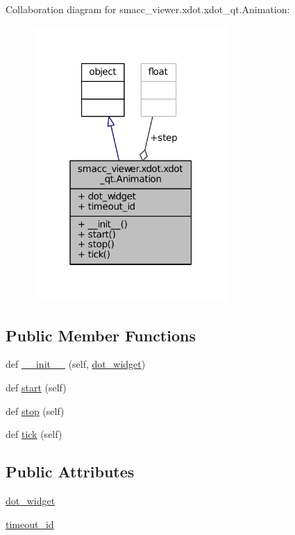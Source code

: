 Collaboration diagram for smacc\+\_\+viewer.\+xdot.\+xdot\+\_\+qt.\+Animation\+:
\nopagebreak
\begin{figure}[H]
\begin{center}
\leavevmode
\includegraphics[width=211pt]{classsmacc__viewer_1_1xdot_1_1xdot__qt_1_1Animation__coll__graph}
\end{center}
\end{figure}
\subsection*{Public Member Functions}
\begin{DoxyCompactItemize}
\item 
def \hyperlink{classsmacc__viewer_1_1xdot_1_1xdot__qt_1_1Animation_a9f97d0f2794cbc850d0e0cfe17545250}{\+\_\+\+\_\+init\+\_\+\+\_\+} (self, \hyperlink{classsmacc__viewer_1_1xdot_1_1xdot__qt_1_1Animation_a8343fc754289769e4199933a2ef8b6c2}{dot\+\_\+widget})
\item 
def \hyperlink{classsmacc__viewer_1_1xdot_1_1xdot__qt_1_1Animation_ae51817045f1a7a2151dfe6ffac96a650}{start} (self)
\item 
def \hyperlink{classsmacc__viewer_1_1xdot_1_1xdot__qt_1_1Animation_a2dcd0c6cbcae7adc73fad78fd3f09e21}{stop} (self)
\item 
def \hyperlink{classsmacc__viewer_1_1xdot_1_1xdot__qt_1_1Animation_a9f6f08e355fca56a746949121d36a47d}{tick} (self)
\end{DoxyCompactItemize}
\subsection*{Public Attributes}
\begin{DoxyCompactItemize}
\item 
\hyperlink{classsmacc__viewer_1_1xdot_1_1xdot__qt_1_1Animation_a8343fc754289769e4199933a2ef8b6c2}{dot\+\_\+widget}
\item 
\hyperlink{classsmacc__viewer_1_1xdot_1_1xdot__qt_1_1Animation_a9008b50eeabf48c6cea1ae475ea37d7f}{timeout\+\_\+id}
\end{DoxyCompactItemize}
